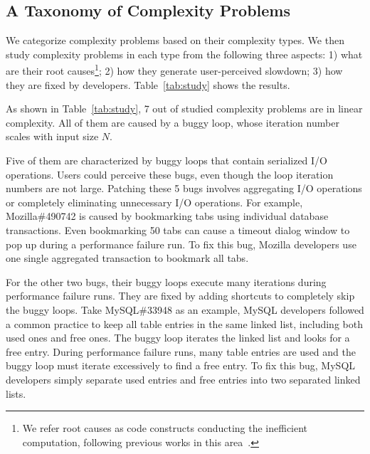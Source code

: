 \subsection{A Taxonomy of Complexity Problems}
\label{sec:tax}



We categorize complexity problems based on their complexity types.
We then study complexity problems in each type from the following three aspects:
1) what are their root causes\footnote{We refer root causes as code constructs 
conducting the inefficient computation, 
following previous works in this area~\cite{SongOOPSLA2014,ldoctor}.};
2) how they generate user-perceived slowdown;
3) how they are fixed by developers. 
Table~\ref{tab:study} shows the results. 

As shown in Table~\ref{tab:study}, 
7 out of \ComBugs studied complexity problems are in linear complexity. 
All of them are caused by a buggy loop, 
whose iteration number scales with input size $N$.

Five of them are characterized by buggy loops that contain serialized I/O operations.
Users could perceive these bugs, 
even though the loop iteration numbers are not large.
Patching these 5 bugs involves aggregating I/O operations 
or completely eliminating unnecessary I/O operations. 
For example, Mozilla\#490742 is caused by bookmarking 
tabs using individual database transactions. 
Even bookmarking 50 tabs can cause a timeout dialog 
window to pop up during a performance failure run. 
To fix this bug, Mozilla developers use one single aggregated transaction 
to bookmark all tabs.

For the other two bugs,
their buggy loops execute many iterations during performance failure runs.
They are fixed by adding shortcuts to completely skip the buggy loops. 
Take MySQL\#33948 as an example,
MySQL developers followed a common practice to keep all table entries in the same linked list, 
including both used ones and free ones. 
The buggy loop iterates the linked list and looks for a free entry.
During performance failure runs, 
many table entries are used and the buggy loop must iterate excessively to find a free entry.
To fix this bug, MySQL developers simply separate used entries and free entries 
into two separated linked lists. 


